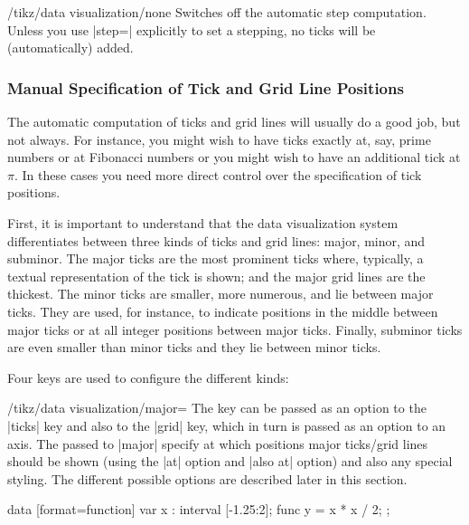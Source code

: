 \begin{key}{/tikz/data visualization/none}
    Switches off the automatic step computation. Unless you use |step=|
    explicitly to set a stepping, no ticks will be (automatically) added.
\end{key}


\subsubsection{Manual Specification of Tick and Grid Line Positions}

The automatic computation of ticks and grid lines will usually do a good job,
but not always. For instance, you might wish to have ticks exactly at, say,
prime numbers or at Fibonacci numbers or you might wish to have an additional
tick at $\pi$. In these cases you need more direct control over the
specification of tick positions.

First, it is important to understand that the data visualization system
differentiates between three kinds of ticks and grid lines: major, minor, and
subminor. The major ticks are the most prominent ticks where, typically, a
textual representation of the tick is shown; and the major grid lines are the
thickest. The minor ticks are smaller, more numerous, and lie between major
ticks. They are used, for instance, to indicate positions in the middle between
major ticks or at all integer positions between major ticks. Finally, subminor
ticks are even smaller than minor ticks and they lie between minor ticks.

Four keys are used to configure the different kinds:

\begin{key}{/tikz/data visualization/major=}
    The key can be passed as an option to the |ticks| key and also to the
    |grid| key, which in turn is passed as an option to an axis. The
     passed to |major| specify at which positions major
    ticks/grid lines should be shown (using the |at| option and |also at|
    option) and also any special styling. The different possible options are
    described later in this section.
\begin{codeexample}[preamble={\usetikzlibrary{datavisualization.formats.functions}}]
\tikz \datavisualization
  [ school book axes, visualize as smooth line,
    x axis={ticks={major={at={1, 1.5, 2}}}}]
  data [format=function] {
    var x : interval [-1.25:2];
    func y = \value x * \value x / 2;
  };
\end{codeexample}
\end{key}

